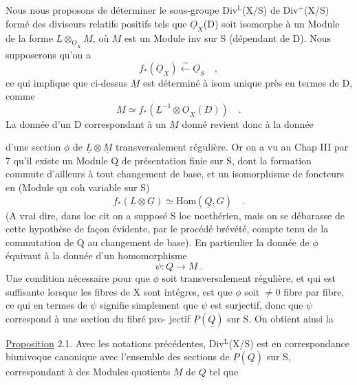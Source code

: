 
Nous nous proposons de déterminer le sous-groupe Div$^{\mathrm{L}}$(X/S) de Div$^{+}$(X/S)
formé des diviseurs relatifs positifs tels que $\underline{O}_X$(D) soit isomorphe à
un Module de la forme $\underline{L}\otimes_{\underline{O}_X}\underline{M}$, où $\underline{M}$ est un Module inv sur S (dépendant de
D). Nous supposerons qu'on a
\[ f_{*}(\underline{O}_X)\overset{\sim}{\longleftarrow}\underline{O}_S \quad , \]
ce qui implique que ci-dessus $\underline{M}$ est déterminé à isom unique près en termes
de D, comme
\[ \underline{M}\simeq f_{*}(\underline{L}^{-1}\otimes\underline{O}_X(D)) \quad . \]
La donnée d'un D correspondant à un $\underline{M}$ donné revient donc à la donnée

d'une section $\phi$ de $\underline{L}\otimes\underline{M}$ transversalement régulière. Or on a vu au
Chap III par 7  qu'il  existe un Module Q de
présentation finie sur S, dont la formation commute d'ailleurs à tout
changement de base, et un isomorphisme de foncteurs en  (Module qu coh
variable sur S)
\[ f_{*}(\underline{L}\otimes\underline{G})\simeq \mathrm{Hom}(\underline{Q},G) \quad . \]
(A vrai dire, dans loc cit on a supposé S loc noethérien, mais on se
débarasse de cette hypothèse de façon évidente, par le procédé brévété,
compte tenu de la commutation de Q au changement de base). En particulier
la donnée de $\phi$ équivaut à  la donnée d'un homomorphisme
\[ \psi : Q \longrightarrow M \ . \]
Une condition nécessaire pour que $\phi$ soit transversalement régulière, et
qui est suffisante lorsque les fibres de X sont intégres, est que $\phi$ soit
$\neq 0$  fibre par fibre, ce qui en termes de $\psi$ signifie simplement que
$\psi$ est surjectif, donc que  $\psi$ correspond à une section du fibré pro-%
jectif $\underline{P}(\underline{Q})$ sur S. On obtient ainsi la

\uline{Proposition} 2.1. Avec les notations  précédentes, Div$^{\mathrm{L}}$(X/S) est
en correspondance biunivoque canonique avec l'ensemble des  sections
de $\underline{P}(\underline{Q})$ sur S, correspondant à des Modules quotients $\underline{M}$ de $\underline{Q}$ tel que

